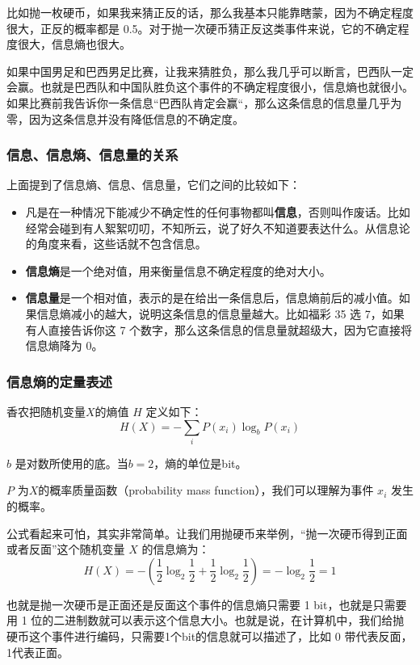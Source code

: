 \documentclass[12pt]{article}
\begin{document}
比如抛一枚硬币，如果我来猜正反的话，那么我基本只能靠瞎蒙，因为不确定程度很大，正反的概率都是 0.5。对于抛一次硬币猜正反这类事件来说，它的不确定程度很大，信息熵也很大。

如果中国男足和巴西男足比赛，让我来猜胜负，那么我几乎可以断言，巴西队一定会赢。也就是巴西队和中国队胜负这个事件的不确定程度很小，信息熵也就很小。如果比赛前我告诉你一条信息“巴西队肯定会赢“，那么这条信息的信息量几乎为零，因为这条信息并没有降低信息的不确定度。

\subsubsection{信息、信息熵、信息量的关系}
上面提到了信息熵、信息、信息量，它们之间的比较如下：

\begin{itemize}[itemindent=2em]
    \item 凡是在一种情况下能减少不确定性的任何事物都叫\textbf{信息}，否则叫作废话。比如经常会碰到有人絮絮叨叨，不知所云，说了好久不知道要表达什么。从信息论的角度来看，这些话就不包含信息。
    
    \item \textbf{信息熵}是一个绝对值，用来衡量信息不确定程度的绝对大小。
    
    \item \textbf{信息量}是一个相对值，表示的是在给出一条信息后，信息熵前后的减小值。如果信息熵减小的越大，说明这条信息的信息量越大。比如福彩 35 选 7，如果有人直接告诉你这 7 个数字，那么这条信息的信息量就超级大，因为它直接将信息熵降为 0。
\end{itemize}

\subsubsection{信息熵的定量表述}
香农把随机变量$X$的熵值 $Η$ 定义如下：
$$H(X) = -\sum_i{P(x_i)\log_bP(x_i)}$$

$b$ 是对数所使用的底。当$b=2$，熵的单位是bit。

$P$ 为$X$的概率质量函数（probability mass function），我们可以理解为事件 $x_i$ 发生的概率。

公式看起来可怕，其实非常简单。让我们用抛硬币来举例，“抛一次硬币得到正面或者反面”这个随机变量 $X$ 的信息熵为：
$$H(X) = -(\frac{1}{2}\log_2{\frac{1}{2}}+\frac{1}{2}\log_2{\frac{1}{2}}) = -\log_2{\frac{1}{2}} = 1 $$

也就是抛一次硬币是正面还是反面这个事件的信息熵只需要 1 bit，也就是只需要用 1 位的二进制数就可以表示这个信息大小。也就是说，在计算机中，我们给抛硬币这个事件进行编码，只需要1个bit的信息就可以描述了，比如 0 带代表反面，1代表正面。
\end{document}
